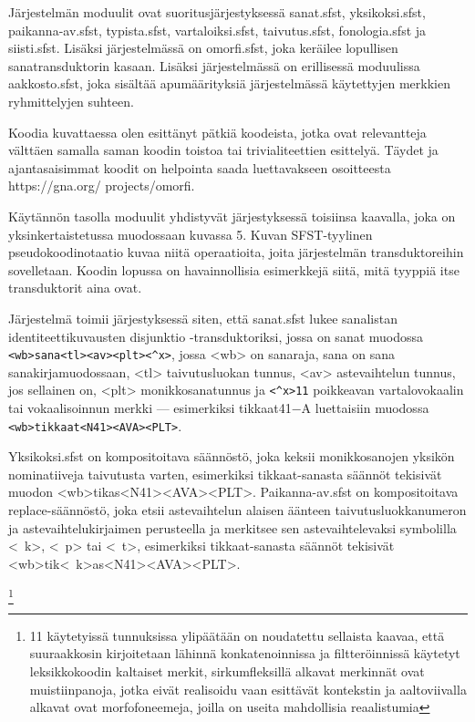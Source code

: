 \documentclass[free]{flammie}
\begin{document}
Järjestelmän
moduulit
ovat
suoritusjärjestyksessä
sanat.sfst,
yksikoksi.sfst,
paikanna-av.sfst,
typista.sfst,
vartaloiksi.sfst,
taivutus.sfst,
fonologia.sfst
ja
siisti.sfst. Lisäksi järjestelmässä on omorfi.sfst, joka keräilee
lopullisen sanatransduktorin kasaan. Lisäksi järjestelmässä on erillisessä moduulissa aakkosto.sfst, joka sisältää apumäärityksiä järjestelmässä käytettyjen
merkkien ryhmittelyjen suhteen.

Koodia kuvattaessa olen esittänyt pätkiä koodeista, jotka ovat relevantteja välttäen
samalla saman koodin toistoa tai trivialiteettien esittelyä. Täydet ja ajantasaisimmat koodit on helpointa saada luettavakseen osoitteesta https://gna.org/
projects/omorfi.

Käytännön tasolla moduulit yhdistyvät järjestyksessä toisiinsa kaavalla, joka on
yksinkertaistetussa muodossaan kuvassa 5. Kuvan SFST-tyylinen pseudokoodinotaatio kuvaa niitä operaatioita, joita järjestelmän transduktoreihin sovelletaan.
Koodin lopussa on havainnollisia esimerkkejä siitä, mitä tyyppiä itse transduktorit
aina ovat.

Järjestelmä toimii järjestyksessä siten, että sanat.sfst lukee sanalistan identiteettikuvausten disjunktio -transduktoriksi, jossa on sanat muodossa
\verb|<wb>sana<tl><av><plt><^x>|, jossa <wb> on sanaraja, sana on sana
sanakirjamuodossaan, <tl> taivutusluokan tunnus, <av> astevaihtelun tunnus,
jos sellainen on, <plt> monikkosanatunnus ja \verb|<^x>11| poikkeavan vartalovokaalin tai vokaalisoinnun merkki — esimerkiksi tikkaat41−A luettaisiin muodossa
\verb|<wb>tikkaat<N41><AVA><PLT>|.

Yksikoksi.sfst on kompositoitava säännöstö, joka keksii monikkosanojen
yksikön nominatiiveja taivutusta varten, esimerkiksi tikkaat-sanasta säännöt tekisivät muodon <wb>tikas<N41><AVA><PLT>.
Paikanna-av.sfst on kompositoitava replace-säännöstö, joka etsii astevaihtelun alaisen äänteen taivutusluokkanumeron ja astevaihtelukirjaimen perusteella
ja merkitsee sen astevaihtelevaksi symbolilla <~k>, <~p> tai <~t>, esimerkiksi tikkaat-sanasta säännöt tekisivät <wb>tik<~k>as<N41><AVA><PLT>.

\footnote{11
käytetyissä tunnuksissa ylipäätään on noudatettu sellaista kaavaa, että
suuraakkosin kirjoitetaan lähinnä konkatenoinnissa ja filtteröinnissä käytetyt
leksikkokoodin kaltaiset merkit, sirkumfleksillä alkavat merkinnät ovat
muistiinpanoja, jotka eivät realisoidu vaan esittävät kontekstin ja
aaltoviivalla alkavat ovat morfofoneemeja, joilla on useita mahdollisia
reaalistumia
}
\end{document}
